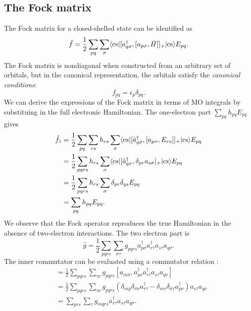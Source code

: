 \documentclass{article}
\begin{document}
\subsection{The Fock matrix}
The Fock matrix for a closed-shelled state can be identified as \cite[Ch. 10.3.2]{helgakerMolecularElectronicStructure2000}
\begin{equation}
    \hat{f}=\frac{1}{2}\sum_{pq}\sum_{\sigma}\langle\mathrm{cs}|[a_{q\sigma}^{\dagger},[a_{p\sigma},\hat{H}]]_+|\mathrm{cs}\rangle E_{pq}.
\end{equation}
The Fock matrix is nondiagonal when constructed from an arbitrary set of orbitals, but in the canonical representation, the orbitals satisfy the \textit{canonical conditions}:
\begin{equation}
f_{pq}=\epsilon_p\delta_{pq}.
\end{equation}
We can derive the expressions of the Fock matrix in terms of MO integrals by substituing in the full electronic Hamiltonian. The one-electron part $\sum_{pq}h_{pq}E_{pq}$ gives
\begin{align}
\hat{f}_1&=\frac{1}{2}\sum_{pq}\sum_{rs}h_{rs}\sum_{\sigma}\langle\mathrm{cs}|[\hat{a}^{\dagger}_{q\sigma},[a_{p\sigma},E_{rs}]]_+|\mathrm{cs}\rangle E_{pq}\\
&=\frac{1}{2}\sum_{pqrs}h_{rs}\sum_{\sigma}\langle\mathrm{cs}|[\hat{a}^{\dagger}_{q\sigma},\delta_{pr}a_{s\sigma}]_+|\mathrm{cs}\rangle E_{pq}\\
&=\frac{1}{2}\sum_{pqrs}h_{rs}\sum_{\sigma}\delta_{pr}\delta_{qs}E_{pq}\\
&=\sum_{pq}h_{pq}E_{pq}.
\end{align}
We observe that the Fock operator reproduces the true Hamiltonian in the absence of two-electron interactions. The two electron part is 
\begin{equation}
\hat{g}=\frac{1}{2}\sum_{pqrs}\sum_{\sigma\tau}g_{pqrs}a_{p\sigma}^{\dagger}a_{r\tau}^{\dagger}a_{s\tau}a_{q\sigma}.
\end{equation}
The inner commutator can be evaluated using a commutator relation \cite[eq. 10.3.20]{helgakerMolecularElectronicStructure2000}:
\begin{align}
[a_{m\sigma},\hat{g}]&=\frac{1}{2}\sum_{pqrs}\sum_{\tau\nu}g_{pqrs}[a_{m\sigma},a^{\dagger}_{p\nu}a^{\dagger}_{r\tau}a_{s\tau}a_{q\nu}]\\
&=\frac{1}{2}\sum_{pqrs}\sum_{\tau\nu}g_{pqrs} (\delta_{mp}\delta_{\sigma\nu}a_{r\tau}^{\dagger}-\delta_{mr}\delta_{\sigma\tau}a^{\dagger}_{p\nu}) a_{s\tau}a_{q\nu}\\
&=\sum_{prs}\sum_{\tau}g_{mqrs}a_{r\tau}^{\dagger}a_{s\tau}a_{q\sigma}.
\end{align}
\end{document}
